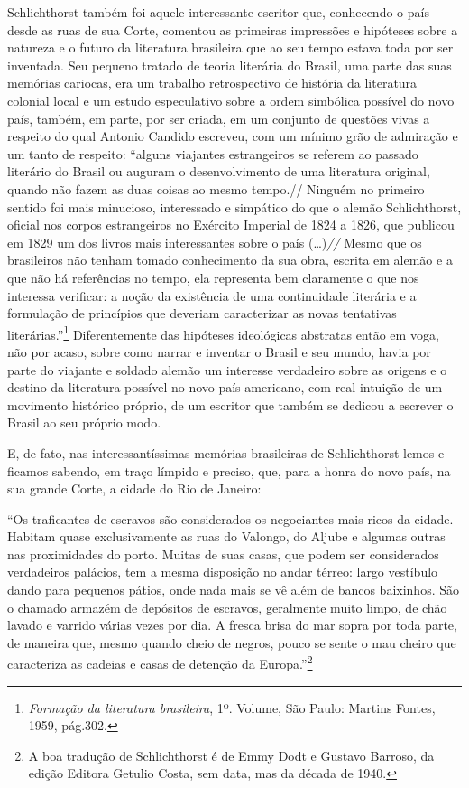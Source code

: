Schlichthorst também foi aquele interessante escritor que, conhecendo o
país desde as ruas de sua Corte, comentou as primeiras impressões e
hipóteses sobre a natureza e o futuro da literatura brasileira que ao
seu tempo estava toda por ser inventada. Seu pequeno tratado de teoria
literária do Brasil, uma parte das suas memórias cariocas, era um
trabalho retrospectivo de história da literatura colonial local e um
estudo especulativo sobre a ordem simbólica possível do novo país,
também, em parte, por ser criada, em um conjunto de questões vivas a
respeito do qual Antonio Candido escreveu, com um mínimo grão de
admiração e um tanto de respeito: ``alguns viajantes estrangeiros se
referem ao passado literário do Brasil ou auguram o desenvolvimento de
uma literatura original, quando não fazem as duas coisas ao mesmo
tempo.// Ninguém no primeiro sentido foi mais minucioso, interessado e
simpático do que o alemão Schlichthorst, oficial nos corpos estrangeiros
no Exército Imperial de 1824 a 1826, que publicou em 1829 um dos livros
mais interessantes sobre o país (\ldots{})\emph{//} Mesmo que os brasileiros
não tenham tomado conhecimento da sua obra, escrita em alemão e a que
não há referências no tempo, ela representa bem claramente o que nos
interessa verificar: a noção da existência de uma continuidade literária
e a formulação de princípios que deveriam caracterizar as novas
tentativas literárias.''\footnote{\emph{Formação da literatura
  brasileira}, 1º. Volume, São Paulo: Martins Fontes, 1959, pág.302.}
Diferentemente das hipóteses ideológicas abstratas então em voga, não
por acaso, sobre como narrar e inventar o Brasil e seu mundo, havia por
parte do viajante e soldado alemão um interesse verdadeiro sobre as
origens e o destino da literatura possível no novo país americano, com
real intuição de um movimento histórico próprio, de um escritor que
também se dedicou a escrever o Brasil ao seu próprio modo.

E, de fato, nas interessantíssimas memórias brasileiras de Schlichthorst
lemos e ficamos sabendo, em traço límpido e preciso, que, para a honra
do novo país, na sua grande Corte, a cidade do Rio de Janeiro:

``Os traficantes de escravos são considerados os negociantes mais ricos
da cidade. Habitam quase exclusivamente as ruas do Valongo, do Aljube e
algumas outras nas proximidades do porto. Muitas de suas casas, que
podem ser considerados verdadeiros palácios, tem a mesma disposição no
andar térreo: largo vestíbulo dando para pequenos pátios, onde nada mais
se vê além de bancos baixinhos. São o chamado armazém de depósitos de
escravos, geralmente muito limpo, de chão lavado e varrido várias vezes
por dia. A fresca brisa do mar sopra por toda parte, de maneira que,
mesmo quando cheio de negros, pouco se sente o mau cheiro que
caracteriza as cadeias e casas de detenção da Europa.''\footnote{A boa
  tradução de Schlichthorst é de Emmy Dodt e Gustavo Barroso, da edição
  Editora Getulio Costa, sem data, mas da década de 1940.}

